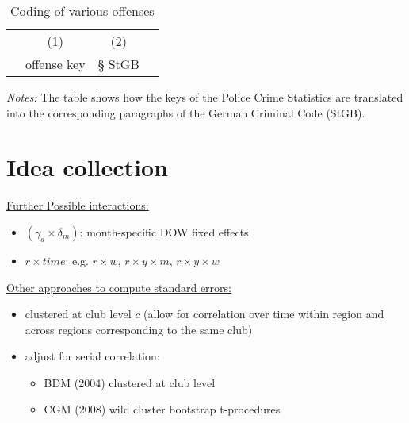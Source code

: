 \documentclass[11pt, a4paper]{article} %
\begin{document}
\newpage
\renewcommand\thetable{A\arabic{table}}
\setcounter{table}{0} 




\vspace*{\fill}
\begin{table}[H]\centering
	\begin{threeparttable}\centering \caption{Coding of various offenses}\label{tab_soc_ext:offense_keys_code}
		\begin{tabular}{lccc}
			\toprule
			&\multicolumn{1}{c}{(1)}&\multicolumn{1}{c}{(2)}\\
			& offense key & § StGB \\
			\midrule
			
			\bottomrule
		\end{tabular}
		\begin{tablenotes}
			\item \scriptsize \emph{Notes:} The table shows how the keys of the Police Crime Statistics are translated into the corresponding paragraphs of the German Criminal Code (StGB).
		\end{tablenotes}
	\end{threeparttable}
\end{table}
\vspace*{\fill}\clearpage






\newpage
\section*{Idea collection}
\underline{Further Possible interactions:} 
\begin{itemize}
	\item $(\gamma_d \times \delta_m)$: month-specific DOW fixed effects
	\item $r \times time$: e.g. $r \times w$, $r \times y \times m$,  $r \times y \times w$
\end{itemize}

\underline{Other approaches to compute standard errors:}
\begin{itemize}
	\item clustered at club level $c$ (allow for correlation over time within region and across regions corresponding to the same club)

	\item adjust for serial correlation: 
	\begin{itemize}
		\item BDM (2004) clustered at club level
		\item CGM (2008) wild cluster bootstrap t-procedures
	\end{itemize}
\end{itemize}
\end{document}
